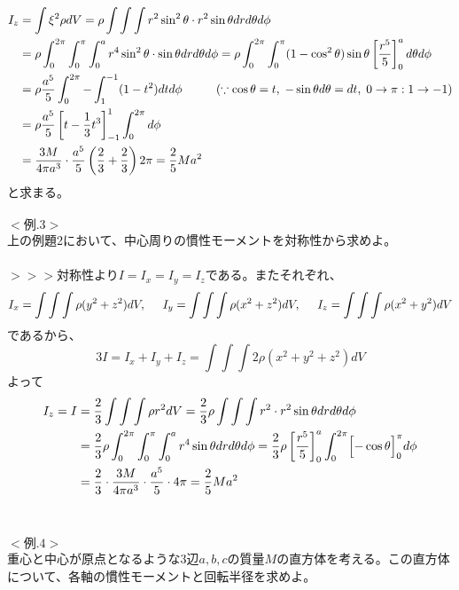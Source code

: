 \documentclass{jsarticle}
\begin{document}
\begin{align*}
I_{z}&=\int\xi^{2}\rho dV=\rho\int\int\int r^{2}\sin^{2}\theta\cdot r^{2}\sin\theta drd\theta d\phi\\
&=\rho\int_{0}^{2\pi}\int_{0}^{\pi}\int_{0}^{a}r^{4}\sin^{2}\theta\cdot\sin\theta drd\theta d\phi=\rho\int_{0}^{2\pi}\int_{0}^{\pi}(1-\cos^{2}\theta)\sin\theta\left[\frac{r^{5}}{5}\right]_{0}^{a}d\theta d\phi\\
&=\rho\frac{a^{5}}{5}\int_{0}^{2\pi}-\int_{1}^{-1}(1-t^{2})dtd\phi\hspace{10mm}(\because\cos\theta=t,\hspace{1mm}-\sin\theta d\theta=dt,\hspace{1mm}0\to\pi:1\to-1)\\
&=\rho\frac{a^{5}}{5}\left[t-\frac{1}{3}t^{3}\right]_{-1}^{1}\int_{0}^{2\pi}d\phi\\
&=\frac{3M}{4\pi a^{3}}\cdot\frac{a^{5}}{5}\left(\frac{2}{3}+\frac{2}{3}\right)2\pi=\frac{2}{5}Ma^{2}
\end{align*}
と求まる。\\
\\
\(<例.3>\)\\
上の例題2において、中心周りの慣性モーメントを対称性から求めよ。\\
\\
\(>>>\)対称性より\(I=I_{x}=I_{y}=I_{z}\)である。またそれぞれ、
\[I_{x}=\int\int\int\rho(y^{2}+z^{2})dV,\hspace{5mm}I_{y}=\int\int\int\rho(x^{2}+z^{2})dV,\hspace{5mm}I_{z}=\int\int\int\rho(x^{2}+y^{2})dV\]
であるから、
\[3I=I_{x}+I_{y}+I_{z}=\int\int\int2\rho(x^{2}+y^{2}+z^{2})dV\]
よって
\begin{align*}
I_{z}=I&=\frac{2}{3}\int\int\int\rho r^{2}dV=\frac{2}{3}\rho\int\int\int r^{2}\cdot r^{2}\sin\theta drd\theta d\phi\\
&=\frac{2}{3}\rho\int_{0}^{2\pi}\int_{0}^{\pi}\int_{0}^{a}r^{4}\sin\theta drd\theta d\phi=\frac{2}{3}\rho\left[\frac{r^{5}}{5}\right]_{0}^{a}\int_{0}^{2\pi}\Bigl[-\cos\theta\Bigr]_{0}^{\pi}d\phi\\
&=\frac{2}{3}\cdot\frac{3M}{4\pi a^{3}}\cdot\frac{a^{5}}{5}\cdot 4\pi=\frac{2}{5}Ma^{2}
\end{align*}\\
\\
\(<例.4>\)\\
重心と中心が原点となるような3辺\(a,b,c\)の質量\(M\)の直方体を考える。この直方体について、各軸の慣性モーメントと回転半径を求めよ。\\
\end{document}
